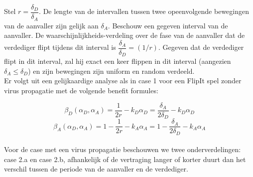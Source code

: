 \documentclass[master=cws, masteroption=vs,english]{kulemt}
\begin{document}
\begin{abstract*}
Stel $r = \dfrac{\delta_{D}}{ \delta_{A} }$. De lengte van de intervallen tussen twee opeenvolgende bewegingen van de aanvaller zijn gelijk aan $\delta_{A}$. Beschouw een gegeven interval van de aanvaller. De waarschijnlijkheids-verdeling over de fase van de aanvaller dat de verdediger flipt tijdens dit interval is $\dfrac{\delta_{A}}{ \delta_{D} } = (1/r)$. Gegeven dat de verdediger flipt in dit interval, zal hij exact een keer flippen in dit interval (aangezien $\delta_{A} \leq \delta_{D} $) en zijn bewegingen zijn uniform en random verdeeld. \\

Er volgt uit een gelijkaardige analyse als in case 1 voor een FlipIt spel zonder virus propagatie met de volgende benefit formules:

\begin{equation}\label{first}
\beta_{D}(\alpha_{D},\alpha_{A}) = \dfrac {1} {2r} - k_{D} \alpha_{D} = \dfrac {\delta_{A}} {2\delta_{D}} - k_{D} \alpha_{D} 
\end{equation}
\begin{equation}\label{first}
\beta_{A}(\alpha_{D},\alpha_{A}) =1 - \dfrac {1} {2r} - k_{A} \alpha_{A} = 1- \dfrac {\delta_{A}} {2\delta_{D}} - k_{A} \alpha_{A}  
\end{equation}\\

Voor de case met een virus propagatie beschouwen we twee onderverdelingen: case 2.a en case 2.b, afhankelijk of de vertraging langer of korter duurt dan het verschil tussen de periode van de aanvaller en de verdediger.


\end{abstract*}
\end{document}
